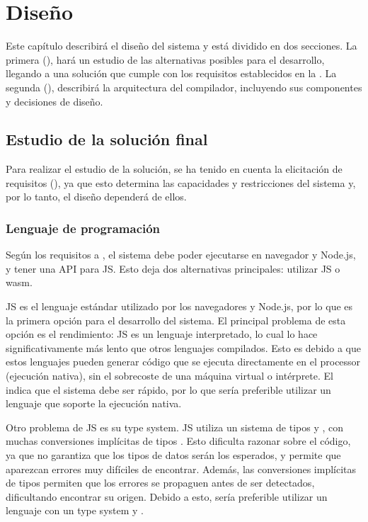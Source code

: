 \chapter{Diseño}\label{chap:design}

Este capítulo describirá el diseño del sistema y está dividido en dos
secciones. La primera (), hará un estudio de las
alternativas posibles para el desarrollo, llegando a una solución que cumple con
los requisitos establecidos en la . La segunda
(), describirá la arquitectura del compilador,
incluyendo sus componentes y decisiones de diseño.

\section{Estudio de la solución final}\label{sec:solution_study}

Para realizar el estudio de la solución, se ha tenido en cuenta la elicitación
de requisitos (), ya que esto determina las capacidades
y restricciones del sistema y, por lo tanto, el diseño dependerá de ellos.

\subsection{Lenguaje de programación}\label{subsec:language}

Según los requisitos  a , el sistema
debe poder ejecutarse en navegador y Node.js, y tener una \gls{API} para
\gls{JS}. Esto deja dos alternativas principales: utilizar \gls{JS} o
\gls{wasm}.

\gls{JS} es el lenguaje estándar utilizado por los navegadores y Node.js, por lo
que es la primera opción para el desarrollo del sistema. El principal problema
de esta opción es el rendimiento: \gls{JS} es un lenguaje interpretado, lo cual
lo hace significativamente más lento que otros lenguajes compilados. Esto es
debido a que estos lenguajes pueden generar código que se ejecuta directamente
en el \gls{processor} (ejecución nativa), sin el sobrecoste de una máquina
virtual o intérprete. El  indica que el sistema debe ser
rápido, por lo que sería preferible utilizar un lenguaje que soporte la
ejecución nativa.

Otro problema de \gls{JS} es su \gls{type system}. \gls{JS} utiliza un sistema de
tipos  y ,
con muchas conversiones implícitas de tipos \parencite{js-type-system}. Esto
dificulta razonar sobre el código, ya que no garantiza que los tipos de datos
serán los esperados, y permite que aparezcan errores muy difíciles de encontrar.
Además, las conversiones implícitas de tipos permiten que los errores se
propaguen antes de ser detectados, dificultando encontrar su origen. Debido a
esto, sería preferible utilizar un lenguaje con un \gls{type system}
 y .


